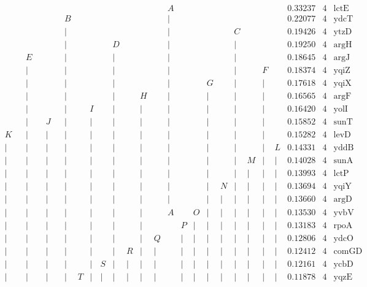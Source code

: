 \documentclass[a4paper]{article}
\begin{document}
{\footnotesize
$$
\begin{array}{ccccccccccccccccccccccccccc}
 & & & & & & & & & & & & & & &A& & & & & & & & &0.33237&4&\mbox{lctE}\\
 & & & & & & &B& & & & & & & &|& & & & & & & & &0.22077&4&\mbox{ydcT}\\
 & & & & & & &|& & & & & & & &|& & & & &C& & & &0.19426&4&\mbox{ytzD}\\
 & & & & & & &|& & & &D& & & &|& & & & &|& & & &0.19250&4&\mbox{argH}\\
 & & &E& & & &|& & & &|& & & &|& & & & &|& & & &0.18645&4&\mbox{argJ}\\
 & & &|& & & &|& & & &|& & & &|& & & & &|& &F& &0.18374&4&\mbox{yqiZ}\\
 & & &|& & & &|& & & &|& & & &|& & &G& &|& &|& &0.17618&4&\mbox{yqiX}\\
 & & &|& & & &|& & & &|& &H& &|& & &|& &|& &|& &0.16565&4&\mbox{argF}\\
 & & &|& & & &|& &I& &|& &|& &|& & &|& &|& &|& &0.16420&4&\mbox{yolI}\\
 & & &|& &J& &|& &|& &|& &|& &|& & &|& &|& &|& &0.15852&4&\mbox{sunT}\\
 &K& &|& &|& &|& &|& &|& &|& &|& & &|& &|& &|& &0.15282&4&\mbox{levD}\\
 &|& &|& &|& &|& &|& &|& &|& &|& & &|& &|& &|&L&0.14331&4&\mbox{yddB}\\
 &|& &|& &|& &|& &|& &|& &|& &|& & &|& &|&M&|&|&0.14028&4&\mbox{sunA}\\
 &|& &|& &|& &|& &|& &|& &|& &|& & &|& &|&|&|&|&0.13993&4&\mbox{lctP}\\
 &|& &|& &|& &|& &|& &|& &|& &|& & &|&N&|&|&|&|&0.13694&4&\mbox{yqiY}\\
 &|& &|& &|& &|& &|& &|& &|& &|& & &|&|&|&|&|&|&0.13660&4&\mbox{argD}\\
 &|& &|& &|& &|& &|& &|& &|& &A& &O&|&|&|&|&|&|&0.13530&4&\mbox{yvbV}\\
 &|& &|& &|& &|& &|& &|& &|& & &P&|&|&|&|&|&|&|&0.13183&4&\mbox{rpoA}\\
 &|& &|& &|& &|& &|& &|& &|&Q& &|&|&|&|&|&|&|&|&0.12806&4&\mbox{ydcO}\\
 &|& &|& &|& &|& &|& &|&R&|&|& &|&|&|&|&|&|&|&|&0.12412&4&\mbox{comGD}\\
 &|& &|& &|& &|& &|&S&|&|&|&|& &|&|&|&|&|&|&|&|&0.12161&4&\mbox{ycbD}\\
 &|& &|& &|& &|&T&|&|&|&|&|&|& &|&|&|&|&|&|&|&|&0.11878&4&\mbox{yqzE}\\

\end{array}$$}
\end{document}
